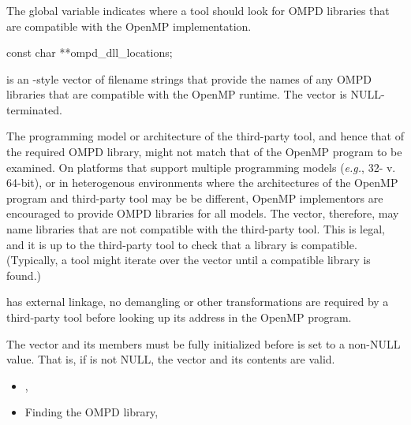 \subsubsection{}
\label{subsubsec:ompd_dll_locations}

\summary
The global variable  indicates
where a tool should look for OMPD libraries that are compatible
with the OpenMP implementation.

\begin{cspecific}
\begin{ompSyntax}
const char **ompd_dll_locations;
\end{ompSyntax}
\end{cspecific}


\descr
{} is an -style vector of filename
strings that provide the names of any OMPD libraries
that are compatible with the OpenMP runtime.
The vector is NULL-terminated.

The programming model or architecture of the third-party tool, and
hence that of the required OMPD library, might not match that of
the OpenMP program to be examined.
On platforms that support multiple programming models (\textit{e.g.},
32- v. 64-bit), or in heterogenous  environments where the architectures
of the OpenMP program and third-party tool may be be different,
OpenMP implementors are encouraged to provide OMPD libraries for all models.
The vector, therefore, may name libraries that are not compatible
with the third-party tool.
This is legal, and it is up to the third-party tool to check that
a library is compatible.
(Typically, a tool might iterate over the vector until a compatible
library is found.)

\restrictions
{} has external  linkage,
no demangling or other transformations are required by a third-party
tool before looking up its address in the OpenMP program.

The vector and its members must be fully initialized before
 is set to a non-NULL value.
That is, if  is not NULL, the vector
and its contents are valid.

\crossreferences
\begin{itemize}
\item
  , 
\item
  Finding the OMPD library, 
\end{itemize}

